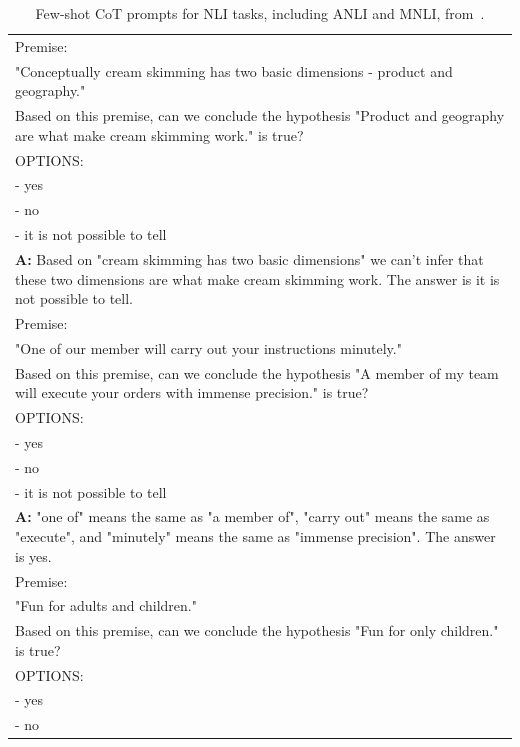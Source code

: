 \begin{table}[h]
    \caption{
    Few-shot CoT prompts for NLI tasks, including ANLI and MNLI, from~\cite{Wang2022RationaleAugmentedEI}.
    }
    \centering
    \small
    \begin{tabular}{p{14cm}}
        \toprule
        Premise:\\
        "Conceptually cream skimming has two basic dimensions - product and geography."\\
        Based on this premise, can we conclude the hypothesis "Product and geography are what make cream skimming work." is true?\\
        OPTIONS:\\
        - yes\\
        - no\\
        - it is not possible to tell\\
        \vspace{-1mm}
        \textbf{A:} Based on "cream skimming has two basic dimensions" we can't infer that these two dimensions are what make cream skimming work. The answer is it is not possible to tell.\\
        \vspace{0mm}
        Premise:\\
        "One of our member will carry out your instructions minutely."\\
        Based on this premise, can we conclude the hypothesis "A member of my team will execute your orders with immense precision." is true?\\
        OPTIONS:\\
        - yes\\
        - no\\
        - it is not possible to tell\\
        \vspace{-1mm}
        \textbf{A:} "one of" means the same as "a member of", "carry out" means the same as "execute", and "minutely" means the same as "immense precision". The answer is yes.\\
        \vspace{0mm}
        Premise:\\
        "Fun for adults and children."\\
        Based on this premise, can we conclude the hypothesis "Fun for only children." is true?\\
        OPTIONS:\\
        - yes\\
        - no\\

\end{tabular}
\end{table}
